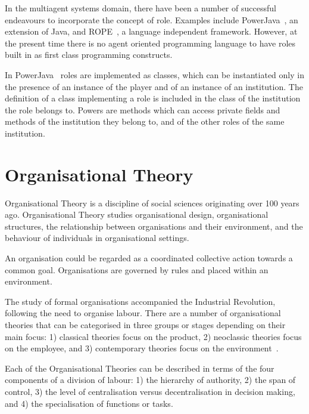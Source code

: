 \documentclass[a4paper,12pt,oneside,fleqn]{book} %
\begin{document}
In the multiagent systems domain, there have been a number of successful
endeavours to incorporate the concept of role. Examples include
PowerJava~\cite{DBLP:journals/entcs/BaldoniBT06}, an extension of Java, and
ROPE~\cite{DBLP:conf/coopis/BechtGKM99}, a language independent framework.
However, at the present time there is no agent oriented programming language
to have roles built in as first class programming constructs.

In PowerJava~\cite{DBLP:conf/sac/BaldoniBT06} roles are implemented as classes, which can be instantiated only
in the presence of an instance of the player and of an instance of an
institution. The definition of a class implementing a role is included in
the class of the institution the role belongs to. Powers are methods which
can access private fields and methods of the institution they belong to,
and of the other roles of the same institution.

\chapter{Organisational Theory}  %

Organisational Theory is a discipline of social sciences originating over 100
years ago. Organisational Theory studies organisational design, organisational
structures, the relationship between organisations and their environment, and
the behaviour of individuals in organisational settings.

An organisation could be regarded as a coordinated collective action
towards a common goal. Organisations are governed by rules and placed
within an environment.

The study of formal organisations accompanied the Industrial
Revolution, following the need to organise labour. There are a number of
organisational theories that can be categorised in three groups or stages
depending on their main focus: 1) classical theories focus on the product,
2) neoclassic theories focus on the employee, and 3) contemporary theories focus
on the environment~\cite{DohertySD01}.

Each of the Organisational Theories can be described in terms of the four
components of a division of labour: 1) the hierarchy of authority, 2) the
span of control, 3) the level of centralisation versus decentralisation in
decision making, and 4) the specialisation of functions or tasks.
\end{document}
